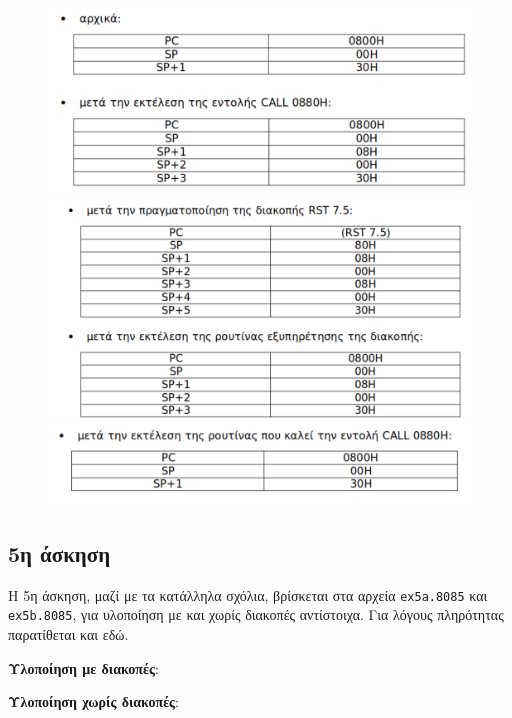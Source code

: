 \documentclass[a4paper]{article}
\begin{document}
\begin{figure}[H]
	\includegraphics[width=\textwidth]{ex4a.pdf}
	\includegraphics[width=\textwidth]{ex4b.pdf}
	\includegraphics[width=\textwidth]{ex4c.pdf}	
\end{figure}

\subsection*{5η άσκηση}
Η 5η άσκηση, μαζί με τα κατάλληλα σχόλια, βρίσκεται στα αρχεία \texttt{ex5a.8085} και \texttt{ex5b.8085}, για υλοποίηση με και χωρίς διακοπές αντίστοιχα.
Για λόγους πληρότητας παρατίθεται και εδώ.

\textbf{Υλοποίηση με διακοπές}:

\textbf{Υλοποίηση χωρίς διακοπές}:
\end{document}
